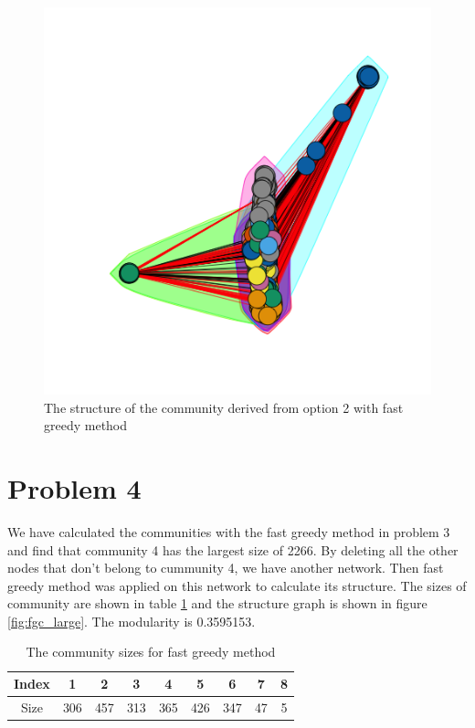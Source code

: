 \documentclass{article}
\begin{document}
\begin{figure}[htbp]
\centering
\captionsetup{justification=centering,margin=2cm}
\includegraphics[width=.6\textwidth]{fgc_opt2.png}
\caption{The structure of the community derived from option 2 with fast greedy method}
\label{fig:fgc_opt2}
\end{figure}


\section{Problem 4}
We have calculated the communities with the fast greedy method in problem 3 and find that community 4 has the largest size of 2266. By deleting all the other nodes that don't belong to cummunity 4, we have another network. Then fast greedy method was applied on this network to calculate its structure. The sizes of community are shown in table \ref{tb:p4_comsize_fgc} and the structure graph is shown in figure \ref{fig:fgc_large}. The modularity is 0.3595153.

\begin {table}[htbp]
\caption{The community sizes for fast greedy method}
\begin{adjustbox}{center}
\label{tb:p4_comsize_fgc}
\begin{tabular}{|c|c|c|c|c|c|c|c|c|}
\hline
Index&1&2&3&4&5&6&7&8\\
\hline
Size&306&457&313&365&426&347&47&5\\
\hline
\end{tabular}
\end{adjustbox}
\end{table}
\end{document}

